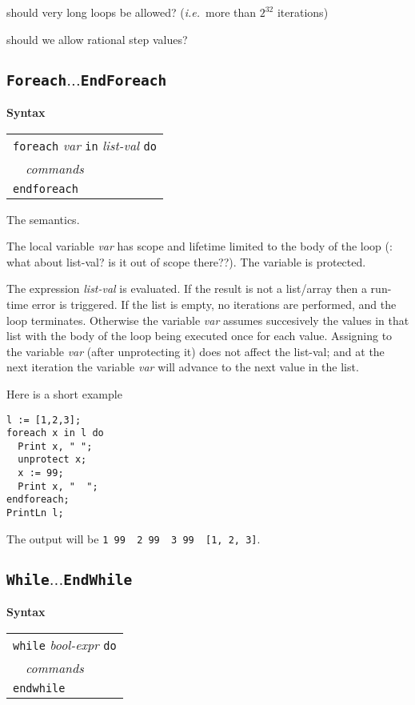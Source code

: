 \documentclass{book}[12,a4paper]
\def\ie{{\it i.e.}}
\def\mydots{$...$}
\newenvironment{syntax}
{\goodbreak\noindent\textbf{Syntax}\\
 \begin{tabular}{|p{0.9\textwidth}|}\hline}
{\\\hline\end{tabular}}
\begin{document}
 should very long loops be allowed? (\ie~more than $2^{32}$ iterations)

 should we allow rational step values?

\subsection{\texttt{Foreach\mydots EndForeach}}
\label{keyword:foreach}

\begin{syntax}
\texttt{foreach} \textit{var} \texttt{in} \textit{list-val} \texttt{do}\\
\ \ \textit{commands}\\
\texttt{endforeach}
\end{syntax}

The semantics.

The local variable \textit{var} has scope and lifetime limited to the body of the loop
(: what about list-val? is it out of scope there??).  The variable is
protected.

The expression \textit{list-val} is evaluated.  If the result is not a
list/array then a run-time error is triggered.  If the list is empty, no
iterations are performed, and the loop terminates.  Otherwise the variable
\textit{var} assumes succesively the values in that list with the body of
the loop being executed once for each value.  Assigning to the variable
\textit{var} (after unprotecting it) does not affect the list-val; and at
the next iteration the variable \textit{var} will advance to the next value
in the list.

Here is a short example
\begin{lstlisting}
l := [1,2,3];
foreach x in l do
  Print x, " ";
  unprotect x;
  x := 99;
  Print x, "  ";
endforeach;
PrintLn l;
\end{lstlisting}
The output will be \verb|1 99  2 99  3 99  [1, 2, 3]|.

\subsection{\texttt{While\mydots EndWhile}}
\label{keyword:while}

\begin{syntax}
\texttt{while} \textit{bool-expr} \texttt{do}\\
\ \ \textit{commands}\\
\texttt{endwhile}
\end{syntax}
\end{document}
